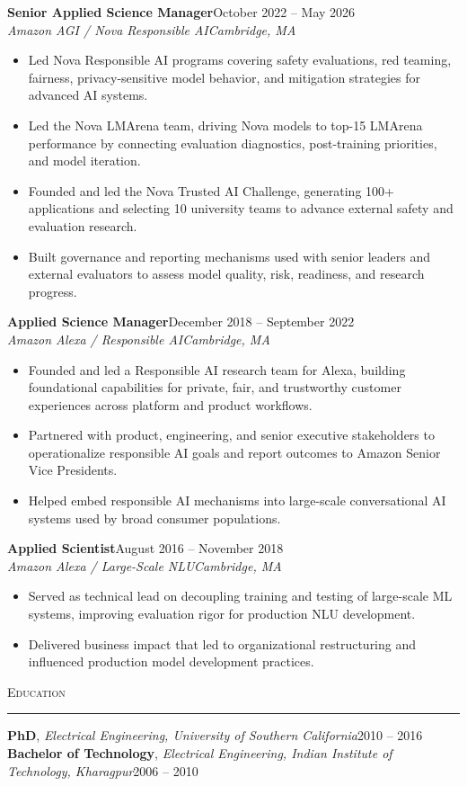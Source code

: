 \documentclass[11pt]{article}
\newcommand{\sectionheading}[1]{%
  \vspace{8pt}%
  {\large\scshape #1}\par\vspace{1pt}\hrule\vspace{3pt}%
}
\newcommand{\resumeentry}[5]{%
  \textbf{#1}\hfill #2\\
  \textit{#3}\hfill \textit{#4}
  \begin{itemize}
    #5
  \end{itemize}
  \vspace{2pt}
}
\begin{document}
\resumeentry
  {Senior Applied Science Manager}
  {October 2022 -- May 2026}
  {Amazon AGI / Nova Responsible AI}
  {Cambridge, MA}
  {\item Led Nova Responsible AI programs covering safety evaluations, red teaming, fairness, privacy-sensitive model behavior, and mitigation strategies for advanced AI systems.
   \item Led the Nova LMArena team, driving Nova models to top-15 LMArena performance by connecting evaluation diagnostics, post-training priorities, and model iteration.
   \item Founded and led the Nova Trusted AI Challenge, generating 100+ applications and selecting 10 university teams to advance external safety and evaluation research.
   \item Built governance and reporting mechanisms used with senior leaders and external evaluators to assess model quality, risk, readiness, and research progress.}

\resumeentry
  {Applied Science Manager}
  {December 2018 -- September 2022}
  {Amazon Alexa / Responsible AI}
  {Cambridge, MA}
  {\item Founded and led a Responsible AI research team for Alexa, building foundational capabilities for private, fair, and trustworthy customer experiences across platform and product workflows.
   \item Partnered with product, engineering, and senior executive stakeholders to operationalize responsible AI goals and report outcomes to Amazon Senior Vice Presidents.
   \item Helped embed responsible AI mechanisms into large-scale conversational AI systems used by broad consumer populations.}

\resumeentry
  {Applied Scientist}
  {August 2016 -- November 2018}
  {Amazon Alexa / Large-Scale NLU}
  {Cambridge, MA}
  {\item Served as technical lead on decoupling training and testing of large-scale ML systems, improving evaluation rigor for production NLU development.
   \item Delivered business impact that led to organizational restructuring and influenced production model development practices.}

\sectionheading{Education}

\textbf{PhD}, \textit{Electrical Engineering, University of Southern California}\hfill 2010 -- 2016\\
\textbf{Bachelor of Technology}, \textit{Electrical Engineering, Indian Institute of Technology, Kharagpur}\hfill 2006 -- 2010
\end{document}
